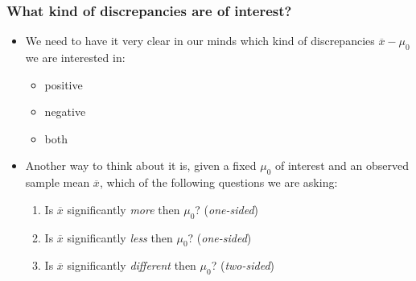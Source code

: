 \documentclass[a4paper]{article}\usepackage[]{graphicx}\usepackage[]{xcolor}
\begin{document}
\subsubsection{What kind of discrepancies are of interest?}
\begin{itemize}
	\item We need to have it very clear in our minds which kind of discrepancies \( \overline{x} - \mu_0 \) we are interested in:
	\begin{itemize}
		\item positive
		\item negative
		\item both
	\end{itemize}
	\item Another way to think about it is, given a fixed \( \mu_0 \) of interest and an observed sample mean \( \overline{x} \), which of the following questions we are asking:
	\begin{enumerate}
		\item Is \( \overline{x} \) significantly \textit{more} then \( \mu_0 \)? (\textit{one-sided})
		\item Is \( \overline{x} \) significantly \textit{less} then \( \mu_0 \)? (\textit{one-sided})
		\item Is \( \overline{x} \) significantly \textit{different} then \( \mu_0 \)? (\textit{two-sided})
	\end{enumerate}
\end{itemize}
\end{document}
